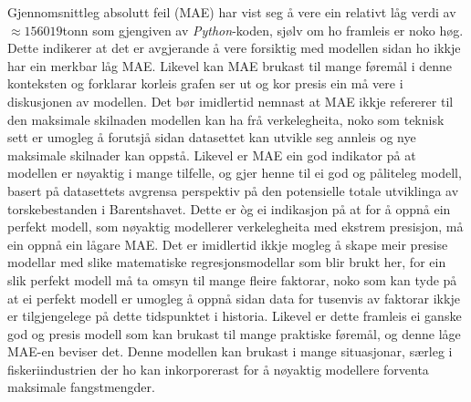 \documentclass{report}
\begin{document}
Gjennomsnittleg absolutt feil (MAE) har vist seg å vere ein relativt låg verdi av $\approx 156019$tonn som gjengiven av \textit{Python}-koden, sjølv om ho framleis er noko høg. Dette indikerer at det er avgjerande å vere forsiktig med modellen sidan ho ikkje har ein merkbar låg MAE.
Likevel kan MAE brukast til mange føremål i denne konteksten og forklarar korleis grafen ser ut og kor presis ein må vere i diskusjonen av modellen.
Det bør imidlertid nemnast at MAE ikkje refererer til den maksimale skilnaden modellen kan ha frå verkelegheita, noko som teknisk sett er umogleg å forutsjå sidan datasettet kan utvikle seg annleis og nye maksimale skilnader kan oppstå.
Likevel er MAE ein god indikator på at modellen er nøyaktig i mange tilfelle, og gjer henne til ei god og påliteleg modell, basert på datasettets avgrensa perspektiv på den potensielle totale utviklinga av torskebestanden i Barentshavet.
Dette er òg ei indikasjon på at for å oppnå ein perfekt modell, som nøyaktig modellerer verkelegheita med ekstrem presisjon, må ein oppnå ein lågare MAE. Det er imidlertid ikkje mogleg å skape meir presise modellar med slike matematiske regresjonsmodellar som blir brukt her, for ein slik perfekt modell må ta omsyn til mange fleire faktorar, noko som kan tyde på at ei perfekt modell er umogleg å oppnå sidan data for tusenvis av faktorar ikkje er tilgjengelege på dette tidspunktet i historia.
Likevel er dette framleis ei ganske god og presis modell som kan brukast til mange praktiske føremål, og denne låge MAE-en beviser det. Denne modellen kan brukast i mange situasjonar, særleg i fiskeriindustrien der ho kan inkorporerast for å nøyaktig modellere forventa maksimale fangstmengder.
\end{document}
